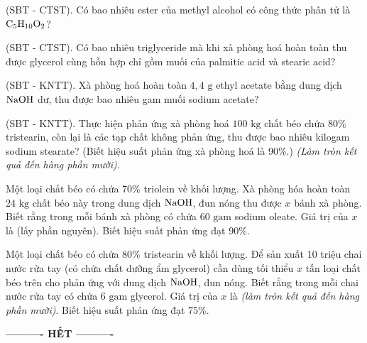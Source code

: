 \documentclass[12pt,a4paper]{article}
\begin{document}
\begin{ex}
(SBT - CTST). Có bao nhiêu ester của methyl alcohol có công thức phân tử là $\ce{C5H10O2}$?
\loigiai{}
\end{ex}

\begin{ex}
(SBT - CTST). Có bao nhiêu triglyceride mà khi xà phòng hoá hoàn toàn thu được glycerol cùng hỗn hợp chỉ gồm muối của palmitic acid và stearic acid?
\loigiai{}
\end{ex}

\begin{ex}
(SBT - KNTT). Xà phòng hoá hoàn toàn $4{,}4\text{ g}$ ethyl acetate bằng dung dịch $\ce{NaOH}$ dư, thu được bao nhiêu gam muối sodium acetate?
\loigiai{}
\end{ex}

\begin{ex}
(SBT - KNTT). Thực hiện phản ứng xà phòng hoá $100\text{ kg}$ chất béo chứa 80\% tristearin, còn lại là các tạp chất không phản ứng, thu được bao nhiêu kilogam sodium stearate? (Biết hiệu suất phản ứng xà phòng hoá là 90\%.) \textit{(Làm tròn kết quả đến hàng phần mười)}.
\loigiai{}
\end{ex}

\begin{ex}
Một loại chất béo có chứa 70\% triolein về khối lượng. Xà phòng hóa hoàn toàn $24\text{ kg}$ chất béo này trong dung dịch $\ce{NaOH}$, đun nóng thu được $x$ bánh xà phòng. Biết rằng trong mỗi bánh xà phòng có chứa $60\text{ gam}$ sodium oleate. Giá trị của $x$ là (lấy phần nguyên). Biết hiệu suất phản ứng đạt 90\%.
\loigiai{}
\end{ex}

\begin{ex}
Một loại chất béo có chứa 80\% tristearin về khối lượng. Để sản xuất 10 triệu chai nước rửa tay (có chứa chất dưỡng ẩm glycerol) cần dùng tối thiểu $x\text{ tấn}$ loại chất béo trên cho phản ứng với dung dịch $\ce{NaOH}$, đun nóng. Biết rằng trong mỗi chai nước rửa tay có chứa $6\text{ gam}$ glycerol. Giá trị của $x$ là \textit{(làm tròn kết quả đến hàng phần mười)}. Biết hiệu suất phản ứng đạt 75\%.
\loigiai{}
\end{ex}


\begin{center}
	\textbf{---------- HẾT ----------}
\end{center}
\end{document}

